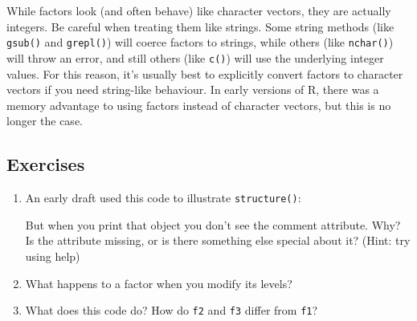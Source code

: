 While factors look (and often behave) like character vectors, they are
actually integers. Be careful when treating them like strings. Some
string methods (like \texttt{gsub()} and \texttt{grepl()}) will coerce
factors to strings, while others (like \texttt{nchar()}) will throw an
error, and still others (like \texttt{c()}) will use the underlying
integer values. For this reason, it's usually best to explicitly convert
factors to character vectors if you need string-like behaviour. In early
versions of R, there was a memory advantage to using factors instead of
character vectors, but this is no longer the case.

\subsection{Exercises}\label{exercises-1}

\begin{enumerate}
\def\labelenumi{\arabic{enumi}.}
\item
  An early draft used this code to illustrate \texttt{structure()}:

\begin{Shaded}
\begin{Highlighting}[]
\NormalTok{(}\NormalTok{:}\NormalTok{, } \NormalTok{)}
\end{Highlighting}
\end{Shaded}

  But when you print that object you don't see the comment attribute.
  Why? Is the attribute missing, or is there something else special
  about it? (Hint: try using help)
\item
  What happens to a factor when you modify its levels?

\begin{Shaded}
\begin{Highlighting}[]
\StringTok{ }
\StringTok{ }\NormalTok{(}
\end{Highlighting}
\end{Shaded}
\item
  What does this code do? How do \texttt{f2} and \texttt{f3} differ from
  \texttt{f1}?

\begin{Shaded}
\begin{Highlighting}[]
\StringTok{ }\NormalTok{(}

\StringTok{ } 
\end{Highlighting}
\end{Shaded}
\end{enumerate}


